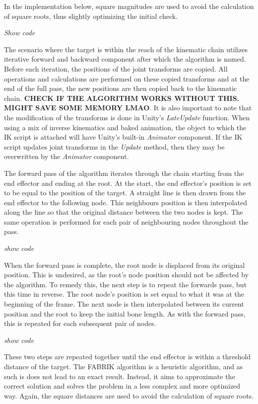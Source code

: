 In the implementation below, square magnitudes are used to
avoid the calculation of square roots, thus slightly optimizing the initial
check.

\textit{Show code}

The scenario where the target is within the reach of the kinematic chain
utilizes iterative forward and backward component after which the algorithm is
named. Before each iteration, the positions of the joint transforms are copied.
All operations and calculations are performed on these copied transforms and at
the end of the full pass, the new positions are then copied back to the
kinematic chain. \textbf{CHECK IF THE ALGORITHM WORKS WITHOUT THIS. MIGHT SAVE
SOME MEMORY LMAO}. It is also important to note that the modification of the
transforms is done in Unity's \textit{LateUpdate} function. When using a mix of
inverse kinematics and baked animation, the object to which the IK script is
attached will have Unity's built-in \textit{Animator} component. If the IK
script updates joint transforms in the \textit{Update} method, then they may be
overwritten by the \textit{Animator} component. 

The forward pass of the algorithm iterates through the chain starting from the
end effector and ending at the root. At the start, the end effector's position
is set to be equal to the position of the target. A straight line is then drawn
from the end effector to the following node. This neighbours position is then
interpolated along the line so that the original distance between the two nodes
is kept. The same operation is performed for each pair of neighbouring nodes
throughout the pass. 

\textit{show code}

When the forward pass is complete, the root node is displaced from its original
position. This is undesired, as the root's node position should not be affected
by the algorithm. To remedy this, the next step is to repeat the forwards pass,
but this time in reverse. The root node's position is set equal to what it was
at the beginning of the frame. The next node is then interpolated between its
current position and the root to keep the initial bone length. As with the
forward pass, this is repeated for each subsequent pair of nodes. 

\textit{show code}

These two steps are repeated together until the end effector is within
a threshold distance of the target. The FABRIK algorithm is a heuristic
algorithm, and as such is does not lead to an exact result. Instead, it aims to
approximate the correct solution and solves the problem in a less complex and
more optimized way. Again, the square distances are used to avoid the
calculation of square roots. 

